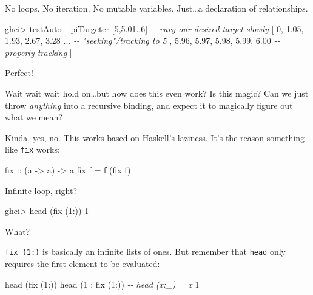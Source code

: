 \documentclass[]{article}
\newenvironment{Shaded}{}{}
\newcommand{\CommentTok}[1]{\textcolor[rgb]{0.38,0.63,0.69}{\textit{#1}}}
\newcommand{\DecValTok}[1]{\textcolor[rgb]{0.25,0.63,0.44}{#1}}
\newcommand{\FloatTok}[1]{\textcolor[rgb]{0.25,0.63,0.44}{#1}}
\newcommand{\FunctionTok}[1]{\textcolor[rgb]{0.02,0.16,0.49}{#1}}
\newcommand{\NormalTok}[1]{#1}
\newcommand{\OperatorTok}[1]{\textcolor[rgb]{0.40,0.40,0.40}{#1}}
\newcommand{\OtherTok}[1]{\textcolor[rgb]{0.00,0.44,0.13}{#1}}
\begin{document}
No loops. No iteration. No mutable variables. Just\ldots a declaration of
relationships.

\begin{Shaded}
\begin{Highlighting}[]
\NormalTok{ghci}\OperatorTok{>}\NormalTok{ testAuto\_ piTargeter [}\DecValTok{5}\NormalTok{,}\FloatTok{5.01}\OperatorTok{..}\DecValTok{6}\NormalTok{]      }\CommentTok{{-}{-} vary our desired target slowly}
\NormalTok{[ }\DecValTok{0}\NormalTok{, }\FloatTok{1.05}\NormalTok{, }\FloatTok{1.93}\NormalTok{, }\FloatTok{2.67}\NormalTok{, }\FloatTok{3.28} \OperatorTok{...}         \CommentTok{{-}{-} "seeking"/tracking to 5}
\NormalTok{, }\FloatTok{5.96}\NormalTok{, }\FloatTok{5.97}\NormalTok{, }\FloatTok{5.98}\NormalTok{, }\FloatTok{5.99}\NormalTok{, }\FloatTok{6.00}          \CommentTok{{-}{-} properly tracking}
\NormalTok{]}
\end{Highlighting}
\end{Shaded}

Perfect!

Wait wait wait hold on\ldots but how does this even work? Is this magic? Can we
just throw \emph{anything} into a recursive binding, and expect it to magically
figure out what we mean?

Kinda, yes, no. This works based on Haskell's laziness. It's the reason
something like \texttt{fix} works:

\begin{Shaded}
\begin{Highlighting}[]
\OtherTok{fix ::}\NormalTok{ (a }\OtherTok{{-}>}\NormalTok{ a) }\OtherTok{{-}>}\NormalTok{ a}
\NormalTok{fix f }\OtherTok{=}\NormalTok{ f (fix f)}
\end{Highlighting}
\end{Shaded}

Infinite loop, right?

\begin{Shaded}
\begin{Highlighting}[]
\NormalTok{ghci}\OperatorTok{>} \FunctionTok{head}\NormalTok{ (fix (}\DecValTok{1}\OperatorTok{:}\NormalTok{))}
\DecValTok{1}
\end{Highlighting}
\end{Shaded}

What?

\texttt{fix\ (1:)} is basically an infinite lists of ones. But remember that
\texttt{head} only requires the first element to be evaluated:

\begin{Shaded}
\begin{Highlighting}[]
\FunctionTok{head}\NormalTok{ (fix (}\DecValTok{1}\OperatorTok{:}\NormalTok{))}
\FunctionTok{head}\NormalTok{ (}\DecValTok{1} \OperatorTok{:}\NormalTok{ fix (}\DecValTok{1}\OperatorTok{:}\NormalTok{))     }\CommentTok{{-}{-} head (x:\_) = x}
\DecValTok{1}
\end{Highlighting}
\end{Shaded}
\end{document}
